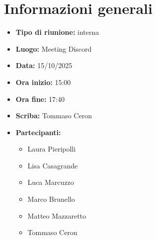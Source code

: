 \section{Informazioni generali}

\begin{itemize}
    \item \textbf{Tipo di riunione:} interna
    \item \textbf{Luogo:} Meeting Discord
    \item \textbf{Data:} 15/10/2025
    \item \textbf{Ora inizio:} 15:00
    \item \textbf{Ora fine:} 17:40
    \item \textbf{Scriba:} Tommaso Ceron
    \item \textbf{Partecipanti:}
    \begin{itemize}
        \renewcommand{\labelitemii}{--}
        \item Laura Pieripolli
        \item Lisa Casagrande
        \item Luca Marcuzzo
        \item Marco Brunello
        \item Matteo Mazzaretto
        \item Tommaso Ceron
    \end{itemize}
\end{itemize}